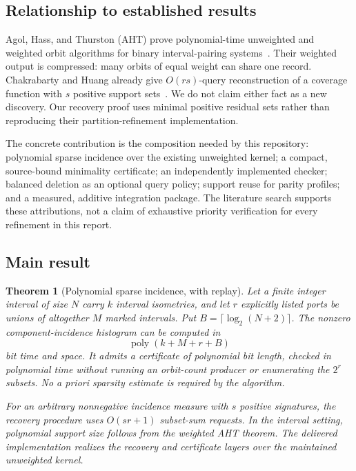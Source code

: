 \documentclass[11pt,letterpaper]{article}
\newtheorem{theorem}{Theorem}[section]
\theoremstyle{definition}\newtheorem{definition}[theorem]{Definition}
\theoremstyle{remark}\newtheorem{remark}[theorem]{Remark}
\newcommand{\poly}{\operatorname{poly}}
\begin{document}
\subsection{Relationship to established results}

Agol, Hass, and Thurston (AHT) prove polynomial-time unweighted and weighted orbit algorithms for binary interval-pairing systems~\cite{aht}. Their weighted output is compressed: many orbits of equal weight can share one record. Chakrabarty and Huang already give $O(rs)$-query reconstruction of a coverage function with $s$ positive support sets~\cite[Theorem~2.2]{coverage}. We do not claim either fact as a new discovery. Our recovery proof uses minimal positive residual sets rather than reproducing their partition-refinement implementation.

The concrete contribution is the composition needed by this repository: polynomial sparse incidence over the existing unweighted kernel; a compact, source-bound minimality certificate; an independently implemented checker; balanced deletion as an optional query policy; support reuse for parity profiles; and a measured, additive integration package. The literature search supports these attributions, not a claim of exhaustive priority verification for every refinement in this report.

\subsection{Main result}

\begin{theorem}[Polynomial sparse incidence, with replay]
\label{thm:main}
Let a finite integer interval of size $N$ carry $k$ interval isometries, and let $r$ explicitly listed ports be unions of altogether $M$ marked intervals. Put $B=\lceil\log_2(N+2)\rceil$. The nonzero component-incidence histogram can be computed in
\[
\poly(k+M+r+B)
\]
bit time and space. It admits a certificate of polynomial bit length, checked in polynomial time without running an orbit-count producer or enumerating the $2^r$ subsets. No a priori sparsity estimate is required by the algorithm.

For an arbitrary nonnegative incidence measure with $s$ positive signatures, the recovery procedure uses $O(sr+1)$ subset-sum requests. In the interval setting, polynomial support size follows from the weighted AHT theorem. The delivered implementation realizes the recovery and certificate layers over the maintained unweighted kernel.
\end{theorem}
\end{document}
